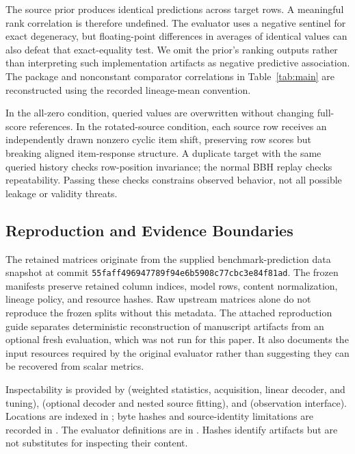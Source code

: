 \documentclass{article}
\begin{document}
The source prior produces identical predictions across target rows. A meaningful rank correlation is therefore undefined. The evaluator uses a negative sentinel for exact degeneracy, but floating-point differences in averages of identical values can also defeat that exact-equality test. We omit the prior's ranking outputs rather than interpreting such implementation artifacts as negative predictive association. The package and nonconstant comparator correlations in Table~\ref{tab:main} are reconstructed using the recorded lineage-mean convention.

In the all-zero condition, queried values are overwritten without changing full-score references. In the rotated-source condition, each source row receives an independently drawn nonzero cyclic item shift, preserving row scores but breaking aligned item-response structure. A duplicate target with the same queried history checks row-position invariance; the normal BBH replay checks repeatability. Passing these checks constrains observed behavior, not all possible leakage or validity threats.

\subsection{Reproduction and Evidence Boundaries}
The retained matrices originate from the supplied benchmark-prediction data snapshot at commit \texttt{55faff496947789f94e6b5908c77cbc3e84f81ad}. The frozen manifests preserve retained column indices, model rows, content normalization, lineage policy, and resource hashes. Raw upstream matrices alone do not reproduce the frozen splits without this metadata. The attached reproduction guide separates deterministic reconstruction of manuscript artifacts from an optional fresh evaluation, which was not run for this paper. It also documents the input resources required by the original evaluator rather than suggesting they can be recovered from scalar metrics.

Inspectability is provided by  (weighted statistics, acquisition, linear decoder, and tuning),  (optional decoder and nested source fitting), and  (observation interface). Locations are indexed in ; byte hashes and source-identity limitations are recorded in . The evaluator definitions are in . Hashes identify artifacts but are not substitutes for inspecting their content.
\end{document}
